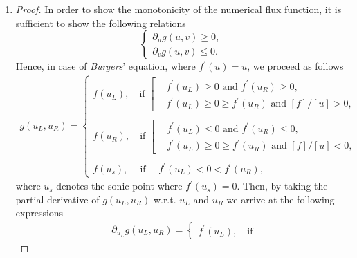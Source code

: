\documentclass[12pt]{article}
\begin{document}
\begin{enumerate}
	\item
	      \begin{proof}
		      In order to show the monotonicity of the numerical flux function,
		      it is sufficient to show the following relations
		      \begin{equation}\label{eq:conditiongeneral}
			      \boxed{
				      \begin{cases}
					      \partial_{u} g(u,v) \geq 0, \\
					      \partial_{v} g(u,v) \leq 0.
				      \end{cases}
			      }
		      \end{equation}
		      Hence, in case of \emph{Burgers}' equation, where $f^\prime(u) = u$, we proceed as follows
		      \begin{align*}
			      g(u_L,u_R)
			      = \begin{cases}
				      f(u_L), \quad  \text{if }
				      \left[
				      \begin{aligned}
					       & f^\prime(u_L) \geq 0 \text{ and } f^\prime(u_R) \geq 0,         \\
					       & f^\prime(u_L) \geq 0 \geq f^\prime(u_R) \text{ and } [f]/[u]>0,
				      \end{aligned}
				      \right.
				      \\
				      \\
				      f(u_R), \quad  \text{if }
				      \left[
				      \begin{aligned}
					       & f^\prime(u_L) \leq 0 \text{ and } f^\prime(u_R) \leq 0,         \\
					       & f^\prime(u_L) \geq 0 \geq f^\prime(u_R) \text{ and } [f]/[u]<0,
				      \end{aligned}
				      \right.
				      \\
				      \\
				      f(u_s), \quad \  \text{if } \quad  f^\prime(u_L) < 0 <  f^\prime(u_R),
				      \quad
			      \end{cases}
		      \end{align*}
		      where $u_s$ denotes the sonic point where $f^\prime(u_s) = 0$.
		      Then, by taking the partial derivative of $g(u_L,u_R)$
		      w.r.t. $u_L$ and $u_R$ we arrive at
		      the following expressions
		      \begin{align*}
			       & \partial_{u_L} g(u_L,u_R)
			      = \begin{cases}
				      f^\prime (u_L), \quad  \text{if }

\end{cases}
\end{align*}
\end{proof}
\end{enumerate}
\end{document}
